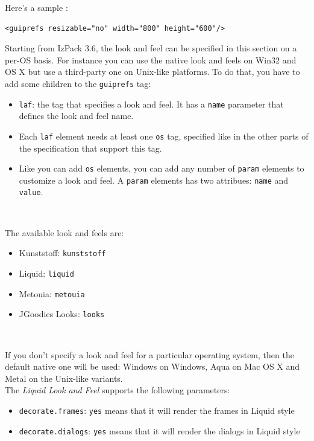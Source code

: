 Here's a sample :
\footnotesize
\begin{verbatim}
<guiprefs resizable="no" width="800" height="600"/>
\end{verbatim}
\normalsize

Starting from IzPack 3.6, the look and feel can be specified in this section on
a per-OS basis. For instance you can use the native look and feels on Win32 and
OS X but use a third-party one on Unix-like platforms. To do that, you have to
add some children to the \texttt{guiprefs} tag:
\begin{itemize}

  \item \texttt{laf}: the tag that specifies a look and feel. It has a
  \texttt{name} parameter that defines the look and feel name.
  \item Each \texttt{laf} element needs at least one \texttt{os} tag, specified
  like in the other parts of the specification that support this tag.
  \item Like you can add \texttt{os} elements, you can add any number of
  \texttt{param} elements to customize a look and feel. A \texttt{param}
  elements has two attribues: \texttt{name} and \texttt{value}.

\end{itemize}\

The available look and feels are:
\begin{itemize}

  \item Kunststoff: \texttt{kunststoff}
  \item Liquid: \texttt{liquid}
  \item Metouia: \texttt{metouia}
  \item JGoodies Looks: \texttt{looks}

\end{itemize}\

If you don't specify a look and feel for a particular operating system, then the
default native one will be used: Windows on Windows, Aqua on Mac OS X and Metal
on the Unix-like variants.\\

The \textit{Liquid Look and Feel} supports the following parameters:
\begin{itemize}

  \item \texttt{decorate.frames}: \texttt{yes} means that it will render the
  frames in Liquid style
  \item \texttt{decorate.dialogs}: \texttt{yes} means that it will render the
  dialogs in Liquid style

\end{itemize}\

